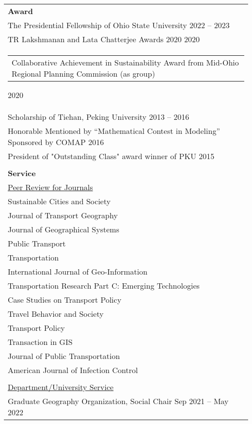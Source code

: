 \documentclass[letterpaper, 11pt]{article}
\begin{document}
\begin{longtable}{p{6.5in}}
\textbf{Award} \\
The Presidential Fellowship of Ohio State University \hfill 2022 -- 2023 \\
TR Lakshmanan and Lata Chatterjee Awards 2020 \hfill 2020 \\
\begin{tabular}{p{5in}}
Collaborative Achievement in Sustainability Award from Mid-Ohio Regional Planning Commission (as group) \end{tabular}\hfill 2020 \\
Scholarship of Tiehan, Peking University \hfill 2013 -- 2016 \\
Honorable Mentioned by “Mathematical Contest in Modeling” Sponsored by COMAP \hfill 2016 \\
President of "Outstanding Class" award winner of PKU \hfill 2015 \\\\

\textbf{Service}\\
\underline{Peer Review for Journals}\\
Sustainable Cities and Society \\
Journal of Transport Geography \\
Journal of Geographical Systems \\
Public Transport \\
Transportation \\
International Journal of Geo-Information \\
Transportation Research Part C: Emerging Technologies \\ 
Case Studies on Transport Policy \\
Travel Behavior and Society \\
Transport Policy \\
Transaction in GIS \\
Journal of Public Transportation \\ 
American Journal of Infection Control \\\\


\underline{Department/University Service}\\
Graduate Geography Organization, Social Chair \hfill Sep 2021 -- May 2022\\


\end{longtable}
\end{document}

